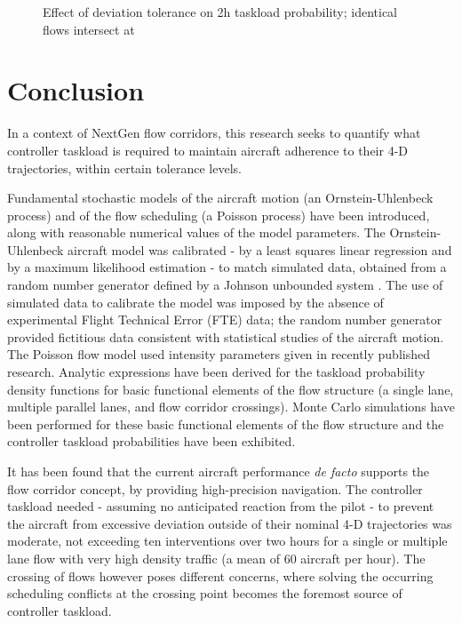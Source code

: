 \documentclass[conference]{IEEEtran}
\begin{document}
\begin{figure}[!h]
\centering
{}
\caption{Effect of deviation tolerance on 2h taskload probability; identical flows intersect at }
\label{fig:120_cross}
\end{figure}

\section{Conclusion}

In a context of NextGen flow corridors, this research seeks to quantify what controller taskload is required to maintain aircraft adherence to their 4-D trajectories, within certain tolerance levels.

Fundamental stochastic models of the aircraft motion (an Ornstein-Uhlenbeck process) and of the flow scheduling (a Poisson process) have been introduced, along with reasonable numerical values of the model parameters. The Ornstein-Uhlenbeck aircraft model was calibrated - by a least squares linear regression and by a maximum likelihood estimation - to match simulated data, obtained from a random number generator defined by a Johnson unbounded system . The use of simulated data to calibrate the model was imposed by the absence of experimental Flight Technical Error (FTE) data; the random number generator provided fictitious data consistent with statistical studies of the aircraft motion. The Poisson flow model used intensity parameters given in recently published research. Analytic expressions have been derived for the taskload probability density functions for basic functional elements of the flow structure (a single lane, multiple parallel lanes, and flow corridor crossings). Monte Carlo simulations have been performed for these basic functional elements of the flow structure and the controller taskload probabilities have been exhibited.

It has been found that the current aircraft performance \emph{de facto} supports the flow corridor concept, by providing high-precision navigation. The controller taskload needed - assuming no anticipated reaction from the pilot - to prevent the aircraft from excessive deviation outside of their nominal 4-D trajectories was moderate, not exceeding ten interventions over two hours for a single or multiple lane flow with very high density traffic (a mean of 60 aircraft per hour). The crossing of flows however poses different concerns, where solving the occurring scheduling conflicts at the crossing point becomes the foremost source of controller taskload.
\end{document}
